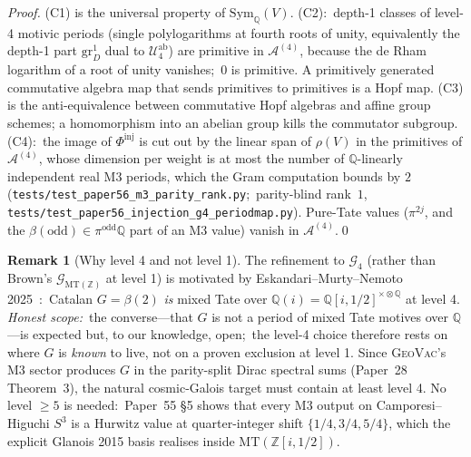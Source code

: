 \documentclass[11pt,a4paper]{article}
\theoremstyle{plain}
\theoremstyle{definition}
\newtheorem{remark}[theorem]{Remark}
\newcommand{\Sym}{\mathrm{Sym}}
\newcommand{\MT}{\mathrm{MT}}
\newcommand{\Q}{\mathbb{Q}}
\newcommand{\Z}{\mathbb{Z}}
\begin{document}
\begin{proof}
(C1) is the universal property of $\Sym_{\Q}(V)$. (C2):\ depth-1 classes of
level-4 motivic periods (single polylogarithms at fourth roots of unity,
equivalently the depth-1 part $\mathrm{gr}^{1}_{D}$ dual to
$\mathcal{U}_{4}^{\mathrm{ab}}$) are primitive in $\mathcal{A}^{(4)}$,
because the de Rham logarithm of a root of unity vanishes;\ $0$ is
primitive. A primitively generated commutative algebra map that sends
primitives to primitives is a Hopf map. (C3) is the anti-equivalence
between commutative Hopf algebras and affine group schemes; a homomorphism
into an abelian group kills the commutator subgroup. (C4):\ the image of
$\Phi^{\mathrm{inj}}$ is cut out by the linear span of $\rho(V)$ in the
primitives of $\mathcal{A}^{(4)}$, whose dimension per weight is at most
the number of $\Q$-linearly independent real M3 periods, which the Gram
computation bounds by $2$
(\texttt{tests/test\_paper56\_m3\_parity\_rank.py};\ parity-blind rank~$1$,
\texttt{tests/test\_paper56\_injection\_g4\_periodmap.py}). Pure-Tate
values ($\pi^{2j}$, and the $\beta(\text{odd}) \in \pi^{\text{odd}}\Q$ part of
an M3 value) vanish in $\mathcal{A}^{(4)}$.\qed
\end{proof}

\begin{remark}[Why level 4 and not level 1]\label{rem:why_level_4}
The refinement to $\mathcal{G}_{4}$ (rather than Brown's
$\mathcal{G}_{\mathrm{MT}(\Z)}$ at level 1) is motivated by
Eskandari--Murty--Nemoto 2025~\cite{eskandari_murty_nemoto2025}:\
Catalan $G = \beta(2)$ \emph{is} mixed Tate over
$\Q(i) = \Q[i, 1/2]^{\times \otimes \Q}$ at level 4.  \emph{Honest scope:}\
the converse---that $G$ is not a period of mixed Tate motives over $\Q$---is
expected but, to our knowledge, open;\ the level-4 choice therefore rests on
where $G$ is \emph{known} to live, not on a proven exclusion at level 1. Since \textsc{GeoVac}'s M3 sector
produces $G$ in the parity-split Dirac spectral sums (Paper~28 Theorem~3),
the natural cosmic-Galois target must contain at least level 4. No
level $\ge 5$ is needed:\ Paper~55 \S 5 shows that every M3 output
on Camporesi--Higuchi $S^{3}$ is a Hurwitz value at quarter-integer
shift $\{1/4, 3/4, 5/4\}$, which the explicit Glanois 2015 basis
realises inside $\MT(\Z[i, 1/2])$.
\end{remark}
\end{document}
